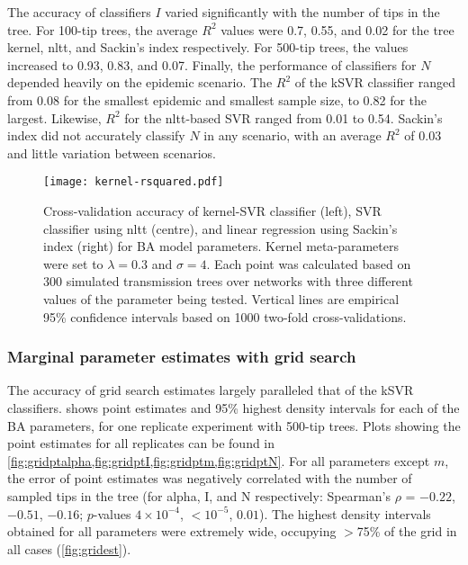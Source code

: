 The accuracy of classifiers $I$ varied significantly with the number of tips in
the tree. For 100-tip trees, the average $R^2$ values were
  0.7,
  0.55, and
  0.02
for the tree kernel, \gls{nltt}, and Sackin's index respectively. For 500-tip
trees, the values increased to
  0.93,
  0.83, and
  0.07.
Finally, the performance of classifiers for $N$ depended heavily on the
epidemic scenario. The $R^2$ of the \gls{kSVR} classifier ranged from
  0.08
for the smallest epidemic and smallest sample size, to
  0.82
for the largest. Likewise, $R^2$ for the \gls{nltt}-based SVR ranged from 
  0.01
to
  0.54.
Sackin's index did not accurately classify $N$ in any scenario, with an average
$R^2$ of
  0.03
and little variation between scenarios.

\begin{figure}[ht]
  \centering
  \texttt{[image: kernel-rsquared.pdf]}
  \caption[Cross-validation accuracy of kernel-SVR, nLTT-based SVR, and
  Sackin's index regression classifiers for BA model parameters.]{
      Cross-validation accuracy of kernel-SVR classifier (left), SVR classifier
      using \gls{nltt} (centre), and linear regression using Sackin's index
      (right) for \gls{BA} model parameters. Kernel meta-parameters were set to
      $\lambda = 0.3$ and $\sigma = 4$. Each point was calculated based on 300
      simulated transmission trees over networks with three different values of
      the parameter being tested. Vertical lines are empirical 95\% confidence
      intervals based on 1000 two-fold cross-validations.
  }
  \label{fig:rsquared}
\end{figure}

\subsubsection*{Marginal parameter estimates with grid search}



The accuracy of grid search estimates largely paralleled that of the \gls{kSVR}
classifiers.  shows point estimates and 95\% highest density
intervals for each of the \gls{BA} parameters, for one replicate experiment
with 500-tip trees. Plots showing the point estimates for all replicates can be
found in \cref{fig:gridptalpha,fig:gridptI,fig:gridptm,fig:gridptN}. For all
parameters except $m$, the error of point estimates was negatively correlated
with the number of sampled tips in the tree (for
\gls{alpha}, \gls{I}, and \gls{N} respectively: Spearman's $\rho$ = 
    \ensuremath{-0.22},
    \ensuremath{-0.51},
    \ensuremath{-0.16};
$p$-values
    $4\!\times\!10^{-4}$,
    ${<}10^{-5}$,
    $0.01$).
The highest density intervals obtained for all parameters were extremely wide,
occupying $>$75\% of the grid in all cases (\cref{fig:gridest}).

